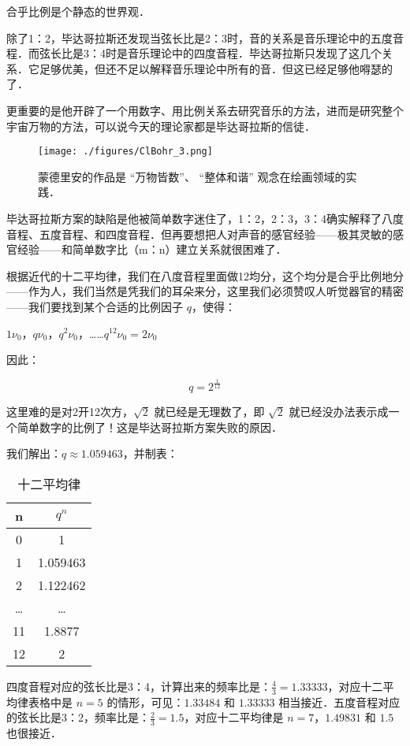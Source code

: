 合乎比例是个静态的世界观．

除了1：2，毕达哥拉斯还发现当弦长比是2：3时，音的关系是音乐理论中的五度音程．而弦长比是3：4时是音乐理论中的四度音程．毕达哥拉斯只发现了这几个关系．它足够优美，但还不足以解释音乐理论中所有的音．但这已经足够他嘚瑟的了．

更重要的是他开辟了一个用数字、用比例关系去研究音乐的方法，进而是研究整个宇宙万物的方法，可以说今天的理论家都是毕达哥拉斯的信徒．

\begin{figure}[ht]
\centering
\texttt{[image: ./figures/ClBohr\_3.png]}
\caption{蒙德里安的作品是 “万物皆数”、 “整体和谐” 观念在绘画领域的实践．} \label{ClBohr_fig3}
\end{figure}

毕达哥拉斯方案的缺陷是他被简单数字迷住了，1：2，2：3，3：4确实解释了八度音程、五度音程、和四度音程．但再要想把人对声音的感官经验——极其灵敏的感官经验——和简单数字比（m：n）建立关系就很困难了．

根据近代的十二平均律，我们在八度音程里面做12均分，这个均分是合乎比例地分——作为人，我们当然是凭我们的耳朵来分，这里我们必须赞叹人听觉器官的精密——我们要找到某个合适的比例因子 $q$，使得：

$1 \nu_0$，$q \nu_0$，$q^2 \nu_0$，……$q^{12} \nu_0 =2 \nu_0$

因此：

\begin{equation}
q = 2^{\frac{1}{12}}
\end{equation}

这里难的是对2开12次方，$\sqrt{2}$ 就已经是无理数了，即 $\sqrt{2}$ 就已经没办法表示成一个简单数字的比例了！这是毕达哥拉斯方案失败的原因．

我们解出：$q \approx 1.059463 $，并制表：

\begin{table}[ht]
\centering
\caption{⼗⼆平均律}\label{ClBohr_tab1}
\begin{tabular}{|c|c|}
\hline
n & $q^n$\\
\hline
0 & 1 \\
\hline
1& 1.059463 \\
\hline
2 & 1.122462 \\
\hline
… & … \\
\hline
11 & 1.8877 \\
\hline
12 & 2 \\
\hline
\end{tabular}
\end{table}


四度音程对应的弦长比是3：4，计算出来的频率比是：$\frac{4}{3} = 1.33333$，对应十二平均律表格中是 $n = 5$ 的情形，可见：$1.33484$ 和 $1.33333$ 相当接近．五度音程对应的弦长比是3：2，频率比是：$\frac{2}{3} = 1.5$，对应十二平均律是 $n=7$，$1.49831$ 和 $1.5$ 也很接近．


